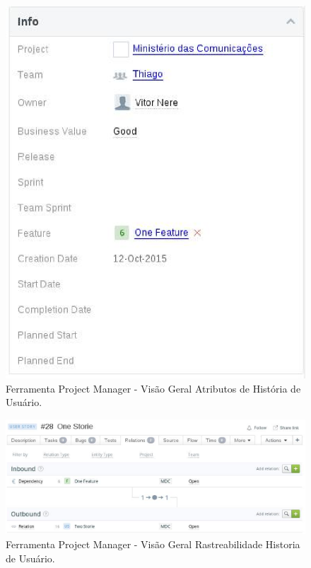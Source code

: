   \begin{figure}[H]
    \centering
  \includegraphics[keepaspectratio=true,scale=0.4]{figuras/ferramenta/pm_user_storie_2.eps}
    \caption{Ferramenta Project Manager - Visão Geral Atributos de História de Usuário.}
    \label{fig:progama}
  \end{figure}

    \begin{figure}[H]
      \centering
    \includegraphics[keepaspectratio=true,scale=0.4]{figuras/ferramenta/pm_user_storie_3.eps}
      \caption{Ferramenta Project Manager - Visão Geral Rastreabilidade Historia de Usuário.}
      \label{fig:progama}
    \end{figure}

